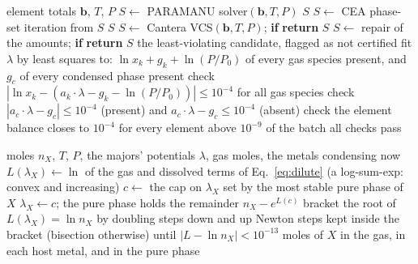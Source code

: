\documentclass[11pt,a4paper]{article}
\begin{document}
\begin{algorithm}[H]
\caption{Certified equilibrium (\texttt{equilibrium.equilibrate} and \texttt{certify})}\label{alg:certify}
\begin{algorithmic}[1]
\Require element totals $\mathbf b$, $T$, $P$
\State $S \gets$ PARAMANU solver$(\mathbf b, T, P)$
 \Return $S$ \EndIf
\State $S \gets$ CEA phase-set iteration from $S$ 
 \Return $S$ \EndIf
\State $S \gets$ Cantera VCS$(\mathbf b, T, P)$; \textbf{if}  \textbf{return} $S$
\State $S \gets$ repair of the amounts; \textbf{if}  \textbf{return} $S$
\State \Return the least-violating candidate, flagged as not certified
\Statex
{}
  \State fit $\lambda$ by least squares to: $\ln x_k + g_k + \ln(P/P_0)$ of every gas species present, and $g_c$ of every condensed phase present
  \State check $|\ln x_k - (a_k\cdot\lambda - g_k - \ln(P/P_0))| \le 10^{-4}$ for all gas species
  \State check $|a_c\cdot\lambda - g_c| \le 10^{-4}$ (present) and $a_c\cdot\lambda - g_c \le 10^{-4}$ (absent)
  \State check the element balance closes to $10^{-4}$ for every element above $10^{-9}$ of the batch
  \State \Return all checks pass
\EndFunction
\end{algorithmic}
\end{algorithm}

\begin{algorithm}[H]
\caption{A trace element in the dilute limit (\texttt{trace\_chem.TraceChemistry.partition})}
\begin{algorithmic}[1]
\Require moles $n_X$, $T$, $P$, the majors' potentials $\lambda$, gas moles, the metals condensing now
\State $L(\lambda_X) \gets \ln$ of the gas and dissolved terms of Eq.~\ref{eq:dilute} (a log-sum-exp: convex and increasing)
\State $c \gets$ the cap on $\lambda_X$ set by the most stable pure phase of $X$
 \State $\lambda_X \gets c$; the pure phase holds the remainder $n_X - e^{L(c)}$
\Else
  \State bracket the root of $L(\lambda_X) = \ln n_X$ by doubling steps down and up
  \State Newton steps kept inside the bracket (bisection otherwise) until $|L - \ln n_X| < 10^{-13}$
\EndIf
\State \Return moles of $X$ in the gas, in each host metal, and in the pure phase
\end{algorithmic}
\end{algorithm}
\end{document}
